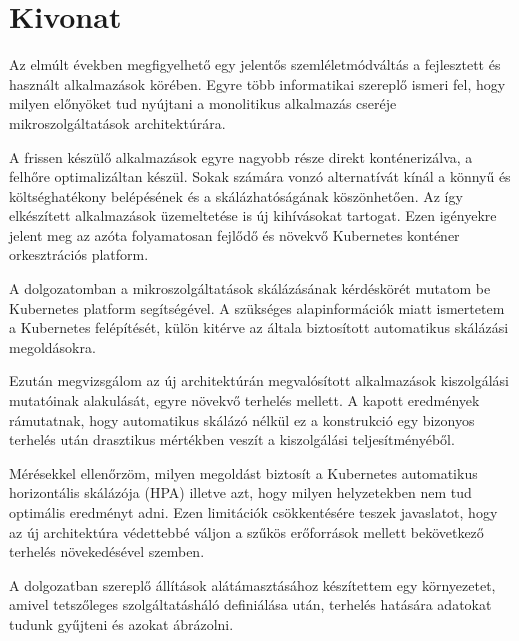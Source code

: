 \setcounter{page}{1}

\selecthungarian

\chapter*{Kivonat}

Az elmúlt években megfigyelhető egy jelentős szemléletmódváltás a fejlesztett és használt alkalmazások körében.
Egyre több informatikai szereplő ismeri fel, hogy milyen előnyöket tud nyújtani a monolitikus alkalmazás cseréje mikroszolgáltatások architektúrára.

A frissen készülő alkalmazások egyre nagyobb része direkt konténerizálva, a felhőre optimalizáltan készül.
Sokak számára vonzó alternatívát kínál a könnyű és költséghatékony belépésének és a skálázhatóságának köszönhetően.
Az így elkészített alkalmazások üzemeltetése  is új kihívásokat tartogat.
Ezen igényekre jelent meg az azóta folyamatosan fejlődő és növekvő Kubernetes konténer orkesztrációs platform.

A dolgozatomban a mikroszolgáltatások skálázásának kérdéskörét mutatom be Kubernetes platform segítségével.
A szükséges alapinformációk miatt ismertetem a Kubernetes felépítését, külön kitérve az általa biztosított automatikus skálázási megoldásokra.

Ezután megvizsgálom az új architektúrán megvalósított alkalmazások kiszolgálási mutatóinak alakulását, egyre növekvő terhelés mellett.
A kapott eredmények rámutatnak, hogy automatikus skálázó nélkül ez a konstrukció egy bizonyos terhelés után drasztikus mértékben veszít a kiszolgálási teljesítményéből.

Mérésekkel ellenőrzöm, milyen megoldást biztosít a Kubernetes automatikus horizontális skálázója (HPA) illetve azt, hogy milyen helyzetekben nem tud optimális eredményt adni.
Ezen limitációk csökkentésére teszek javaslatot, hogy az új architektúra védettebbé váljon a szűkös erőforrások mellett bekövetkező terhelés növekedésével szemben.

A dolgozatban szereplő állítások alátámasztásához készítettem egy környezetet, amivel tetszőleges szolgáltatásháló definiálása után, terhelés hatására adatokat tudunk gyűjteni és azokat ábrázolni.

